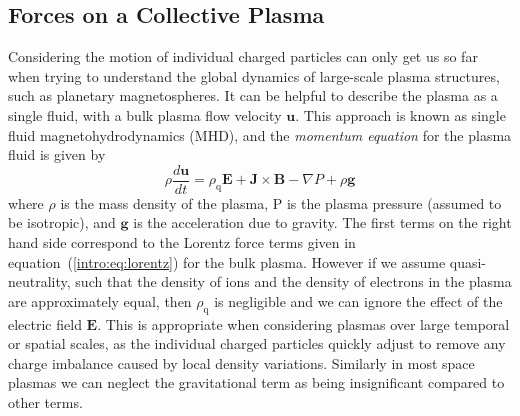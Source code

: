 \subsection{Forces on a Collective Plasma}\label{intro:sec:plasmaforces}
Considering the motion of individual charged particles can only get us so far when trying to understand the global dynamics of large-scale plasma structures, such as planetary magnetospheres. It can be helpful to describe the plasma as a single fluid, with a bulk plasma flow velocity $\boldsymbol{u}$. This approach is known as single fluid magnetohydrodynamics (MHD), and the \textit{momentum equation} for the plasma fluid is given by
\begin{equation}\label{intro:eq:momentum}
\rho\frac{d\boldsymbol{u}}{dt} = \rho_\mathrm{q}\boldsymbol{E} + \boldsymbol{J}\times\boldsymbol{B} - \nabla P + \rho \boldsymbol{g}
\end{equation}
where $\rho$ is the mass density of the plasma, P is the plasma pressure (assumed to be isotropic), and $\boldsymbol{g}$ is the acceleration due to gravity. The first terms on the right hand side correspond to the Lorentz force terms given in equation~(\ref{intro:eq:lorentz}) for the bulk plasma. However if we assume quasi-neutrality, such that the density of ions and the density of electrons in the plasma are approximately equal, then $\rho_\mathrm{q}$ is negligible and we can ignore the effect of the electric field $\boldsymbol{E}$. This is appropriate when considering plasmas over large temporal or spatial scales, as the individual charged particles quickly adjust to remove any charge imbalance caused by local density variations. Similarly in most space plasmas we can neglect the gravitational term as being insignificant compared to other terms.


